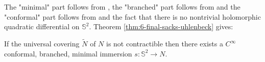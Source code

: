The "minimal" part follows from \cite{eells_harmonic_1964}, the "branched" part
follows from \cite{gulliver_theory_1973} and the "conformal" part follows from
\cite{chern_volume_1975} and the fact that there is no nontrivial holomorphic quadratic
differential on \(\mathbb{S}^2\). Theorem \ref{thm:6-final-sacks-uhlenbeck} gives:

\begin{theorem}
If the universal covering \(\tilde N\) of \(N\) is not contractible then there exists
a \(C^\infty\) conformal, branched, minimal immersion \(s: \mathbb{S}^2 \longrightarrow N\).
\end{theorem}


\iffalse


\fi
